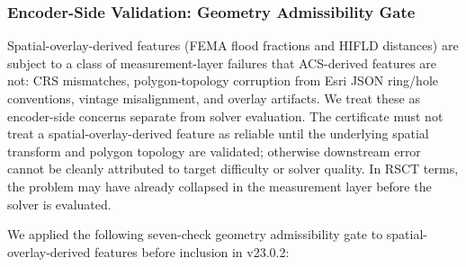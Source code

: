 \documentclass{article}
\begin{document}
\subsubsection{Encoder-Side Validation: Geometry Admissibility Gate}

Spatial-overlay-derived features (FEMA flood fractions and HIFLD distances) are subject to a class of measurement-layer failures that ACS-derived features are not: CRS mismatches, polygon-topology corruption from Esri JSON ring/hole conventions, vintage misalignment, and overlay artifacts. We treat these as encoder-side concerns separate from solver evaluation. The certificate must not treat a spatial-overlay-derived feature as reliable until the underlying spatial transform and polygon topology are validated; otherwise downstream error cannot be cleanly attributed to target difficulty or solver quality. In RSCT terms, the problem may have already collapsed in the measurement layer before the solver is evaluated.

We applied the following seven-check geometry admissibility gate to spatial-overlay-derived features before inclusion in v23.0.2:
\end{document}
